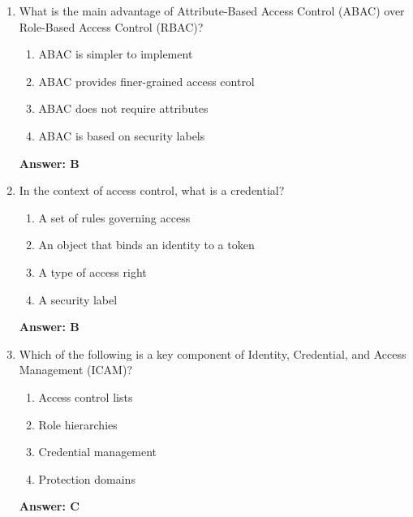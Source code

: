 \documentclass{article}
\begin{document}
\begin{enumerate}
    \item What is the main advantage of Attribute-Based Access Control (ABAC) over Role-Based Access Control (RBAC)?
    \begin{enumerate}[label=\Alph*)]
        \item ABAC is simpler to implement
        \item ABAC provides finer-grained access control
        \item ABAC does not require attributes
        \item ABAC is based on security labels
    \end{enumerate}
    \textbf{Answer: B}

    \item In the context of access control, what is a credential?
    \begin{enumerate}[label=\Alph*)]
        \item A set of rules governing access
        \item An object that binds an identity to a token
        \item A type of access right
        \item A security label
    \end{enumerate}
    \textbf{Answer: B}

    \item Which of the following is a key component of Identity, Credential, and Access Management (ICAM)?
    \begin{enumerate}[label=\Alph*)]
        \item Access control lists
        \item Role hierarchies
        \item Credential management
        \item Protection domains
    \end{enumerate}
    \textbf{Answer: C}
\end{enumerate}

\
\end{document}
